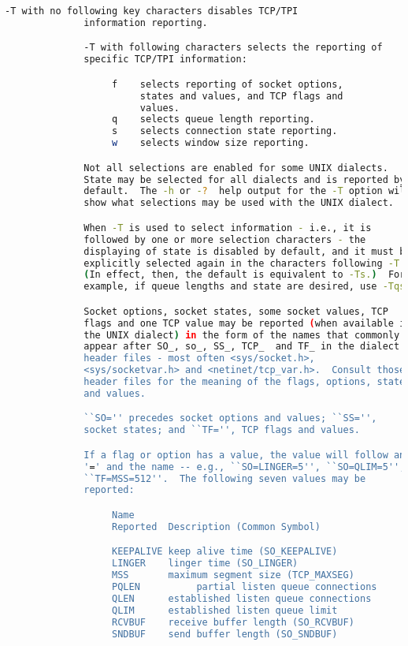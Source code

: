 {{\begin{lstlisting}[language=bash]
              -T with no following key characters disables TCP/TPI
              information reporting.

              -T with following characters selects the reporting of
              specific TCP/TPI information:

                   f    selects reporting of socket options,
                        states and values, and TCP flags and
                        values.
                   q    selects queue length reporting.
                   s    selects connection state reporting.
                   w    selects window size reporting.

              Not all selections are enabled for some UNIX dialects.
              State may be selected for all dialects and is reported by
              default.  The -h or -?  help output for the -T option will
              show what selections may be used with the UNIX dialect.

              When -T is used to select information - i.e., it is
              followed by one or more selection characters - the
              displaying of state is disabled by default, and it must be
              explicitly selected again in the characters following -T.
              (In effect, then, the default is equivalent to -Ts.)  For
              example, if queue lengths and state are desired, use -Tqs.

              Socket options, socket states, some socket values, TCP
              flags and one TCP value may be reported (when available in
              the UNIX dialect) in the form of the names that commonly
              appear after SO_, so_, SS_, TCP_  and TF_ in the dialect's
              header files - most often <sys/socket.h>,
              <sys/socketvar.h> and <netinet/tcp_var.h>.  Consult those
              header files for the meaning of the flags, options, states
              and values.

              ``SO='' precedes socket options and values; ``SS='',
              socket states; and ``TF='', TCP flags and values.

              If a flag or option has a value, the value will follow an
              '=' and the name -- e.g., ``SO=LINGER=5'', ``SO=QLIM=5'',
              ``TF=MSS=512''.  The following seven values may be
              reported:

                   Name
                   Reported  Description (Common Symbol)

                   KEEPALIVE keep alive time (SO_KEEPALIVE)
                   LINGER    linger time (SO_LINGER)
                   MSS       maximum segment size (TCP_MAXSEG)
                   PQLEN          partial listen queue connections
                   QLEN      established listen queue connections
                   QLIM      established listen queue limit
                   RCVBUF    receive buffer length (SO_RCVBUF)
                   SNDBUF    send buffer length (SO_SNDBUF)


\end{lstlisting}}}
